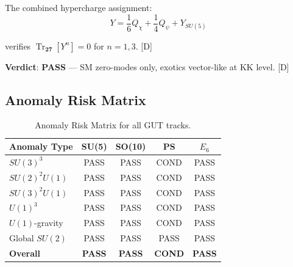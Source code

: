 \documentclass[11pt,a4paper]{article}
\newcommand{\tagD}{\textcolor{blue!70!black}{[D]}}
\DeclareMathOperator{\Tr}{Tr}
\begin{document}
\begin{auditbox}
The combined hypercharge assignment:
\begin{equation}
\label{eq:e6-hypercharge}
Y = \frac{1}{6}Q_\chi + \frac{1}{4}Q_\psi + Y_{SU(5)}
\end{equation}

verifies $\Tr_{\mathbf{27}}[Y^n] = 0$ for $n = 1, 3$. \tagD

\textbf{Verdict}: \textcolor{green!60!black}{\textbf{PASS}} --- SM zero-modes only, exotics vector-like at KK level.
\tagD
\end{auditbox}

\subsection{Anomaly Risk Matrix}

\begin{table}[h]
\centering
\caption{Anomaly Risk Matrix for all GUT tracks.}
\label{tab:anomaly-matrix}
\begin{tabular}{lcccc}
\toprule
Anomaly Type & SU(5) & SO(10) & PS & $E_6$ \\
\midrule
$SU(3)^3$ & \textcolor{green!60!black}{PASS} & \textcolor{green!60!black}{PASS} & \textcolor{orange!70!black}{COND} & \textcolor{green!60!black}{PASS} \\
$SU(2)^2 U(1)$ & \textcolor{green!60!black}{PASS} & \textcolor{green!60!black}{PASS} & \textcolor{orange!70!black}{COND} & \textcolor{green!60!black}{PASS} \\
$SU(3)^2 U(1)$ & \textcolor{green!60!black}{PASS} & \textcolor{green!60!black}{PASS} & \textcolor{orange!70!black}{COND} & \textcolor{green!60!black}{PASS} \\
$U(1)^3$ & \textcolor{green!60!black}{PASS} & \textcolor{green!60!black}{PASS} & \textcolor{orange!70!black}{COND} & \textcolor{green!60!black}{PASS} \\
$U(1)$-gravity & \textcolor{green!60!black}{PASS} & \textcolor{green!60!black}{PASS} & \textcolor{orange!70!black}{COND} & \textcolor{green!60!black}{PASS} \\
Global $SU(2)$ & \textcolor{green!60!black}{PASS} & \textcolor{green!60!black}{PASS} & \textcolor{green!60!black}{PASS} & \textcolor{green!60!black}{PASS} \\
\midrule
\textbf{Overall} & \textcolor{green!60!black}{\textbf{PASS}} & \textcolor{green!60!black}{\textbf{PASS}} & \textcolor{orange!70!black}{\textbf{COND}} & \textcolor{green!60!black}{\textbf{PASS}} \\
\bottomrule
\end{tabular}
\end{table}
\end{document}
